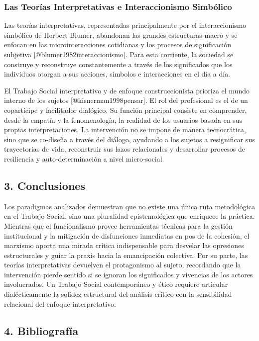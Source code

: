 \documentclass[12pt,spanish]{article}
\begin{document}
\subsubsection{Las Teorías Interpretativas e Interaccionismo
Simbólico}\label{las-teoruxedas-interpretativas-e-interaccionismo-simbuxf3lico}

Las teorías interpretativas, representadas principalmente por el
interaccionismo simbólico de Herbert Blumer, abandonan las grandes
estructuras macro y se enfocan en las microinteracciones cotidianas y
los procesos de significación subjetiva
{[}@blumer1982interaccionismo{]}. Para esta corriente, la sociedad se
construye y reconstruye constantemente a través de los significados que
los individuos otorgan a sus acciones, símbolos e interacciones en el
día a día.

El Trabajo Social interpretativo y de enfoque construccionista prioriza
el mundo interno de los sujetos {[}@kisnerman1998pensar{]}. El rol del
profesional es el de un copartícipe y facilitador dialógico. Su función
principal consiste en comprender, desde la empatía y la fenomenología,
la realidad de los usuarios basada en sus propias interpretaciones. La
intervención no se impone de manera tecnocrática, sino que se co-diseña
a través del diálogo, ayudando a los sujetos a resignificar sus
trayectorias de vida, reconstruir sus lazos relacionales y desarrollar
procesos de resiliencia y auto-determinación a nivel micro-social.

\subsection{3. Conclusiones}\label{conclusiones}

Los paradigmas analizados demuestran que no existe una única ruta
metodológica en el Trabajo Social, sino una pluralidad epistemológica
que enriquece la práctica. Mientras que el funcionalismo provee
herramientas técnicas para la gestión institucional y la mitigación de
disfunciones inmediatas en pos de la cohesión, el marxismo aporta una
mirada crítica indispensable para desvelar las opresiones estructurales
y guiar la praxis hacia la emancipación colectiva. Por su parte, las
teorías interpretativas devuelven el protagonismo al sujeto, recordando
que la intervención pierde sentido si se ignoran los significados y
vivencias de los actores involucrados. Un Trabajo Social contemporáneo y
ético requiere articular dialécticamente la solidez estructural del
análisis crítico con la sensibilidad relacional del enfoque
interpretativo.

\subsection{4. Bibliografía}\label{bibliografuxeda}
\end{document}
